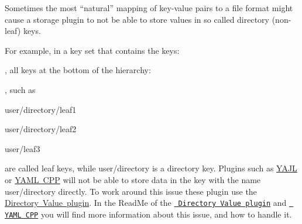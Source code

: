 \begin{DoxyCode}{0}
\DoxyCodeLine{}
\DoxyCodeLine{}
\DoxyCodeLine{}
\DoxyCodeLine{}
\DoxyCodeLine{}
\end{DoxyCode}


Sometimes the most “natural” mapping of key-\/value pairs to a file format might cause a storage plugin to not be able to store values in so called directory (non-\/leaf) keys.

For example, in a key set that contains the keys\+:


\begin{DoxyCode}{0}
\end{DoxyCode}


, all keys at the bottom of the hierarchy\+:


\begin{DoxyCode}{0}
\DoxyCodeLine{      /      \(\backslash\)}
\DoxyCodeLine{   /     \(\backslash\)}
\end{DoxyCode}


, such as


\begin{DoxyItemize}
\item {\ttfamily user/directory/leaf1}
\item {\ttfamily user/directory/leaf2}
\item {\ttfamily user/leaf3}
\end{DoxyItemize}

are called leaf keys, while {\ttfamily user/directory} is a directory key. Plugins such as \mbox{\hyperlink{autotoc_md726_src_plugins_yajl_README_md}{Y\+A\+JL}} or \mbox{\hyperlink{autotoc_md780_src_plugins_yamlcpp_README_md}{Y\+A\+ML C\+PP}} will not be able to store data in the key with the name {\ttfamily user/directory} directly. To work around this issue these plugin use the \mbox{\hyperlink{autotoc_md181_src_plugins_directoryvalue_README_md}{Directory Value plugin}}. In the Read\+Me of the \href{https://www.libelektra.org/plugins/directoryvalue}{\texttt{ Directory Value plugin}} and \href{https://www.libelektra.org/plugins/yamlcpp}{\texttt{ Y\+A\+ML C\+PP}} you will find more information about this issue, and how to handle it.

